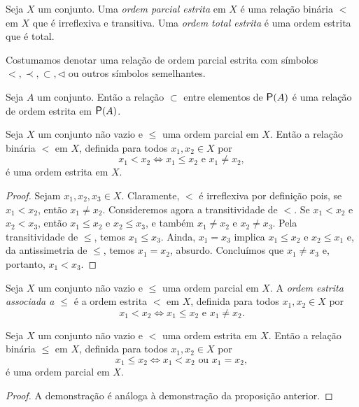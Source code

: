 \begin{definition}
	Seja $X$ um conjunto. Uma \emph{ordem parcial estrita} em $X$ é uma relação binária $<$ em $X$ que é irreflexiva e transitiva. Uma \emph{ordem total estrita} é uma ordem estrita que é total.
\end{definition}

	Costumamos denotar uma relação de ordem parcial estrita com símbolos $<, \prec, \subset, \lhd$ ou outros símbolos semelhantes.

\begin{example}
	Seja $A$ um conjunto. Então a relação $\subset$ entre elementos de $\p(A)$ é uma relação de ordem estrita em $\p(A)$.
\end{example}

\begin{proposition}
	Seja $X$ um conjunto não vazio e $\leq$ uma ordem parcial em $X$. Então a relação binária $<$ em $X$, definida para todos $x_1,x_2 \in X$ por
	\begin{equation*}
	x_1 < x_2 \Leftrightarrow x_1 \leq x_2 \text{\ \ e\ \ } x_1 \neq x_2,
	\end{equation*}
é uma ordem estrita em $X$.
\end{proposition}
\begin{proof}
	Sejam $x_1,x_2,x_3 \in X$. Claramente, $<$ é irreflexiva por definição pois, se $x_1 < x_2$, então $x_1 \neq x_2$. Consideremos agora a transitividade de $<$. Se $x_1 < x_2$ e $x_2 < x_3$, então $x_1 \leq x_2$ e $x_2 \leq x_3$, e também $x_1 \neq x_2$ e $x_2 \neq x_3$. Pela transitividade de $\leq$, temos $x_1 \leq x_3$. Ainda, $x_1=x_3$ implica $x_1 \leq x_2$ e $x_2 \leq x_1$ e, da antissimetria de $\leq$, temos $x_1 = x_2$, absurdo. Concluímos que $x_1 \neq x_3$ e, portanto, $x_1 < x_3$.
\end{proof}

\begin{definition}
	Seja $X$ um conjunto não vazio e $\leq$ uma ordem parcial em $X$. A \emph{ordem estrita associada a $\leq$} é a ordem estrita $<$ em $X$, definida para todos $x_1,x_2 \in X$ por
	\begin{equation*}
	x_1 < x_2 \Leftrightarrow x_1 \leq x_2 \text{\ \ e\ \ } x_1 \neq x_2.
	\end{equation*}
\end{definition}

\begin{proposition}
	Seja $X$ um conjunto não vazio e $<$ uma ordem estrita em $X$. Então a relação binária $\leq$ em $X$, definida para todos $x_1,x_2 \in X$ por
	\begin{equation*}
	x_1 \leq x_2 \Leftrightarrow x_1 < x_2 \text{\ \ ou\ \ } x_1 = x_2,
	\end{equation*}
é uma ordem parcial em $X$.
\end{proposition}
\begin{proof}
	A demonstração é análoga à demonstração da proposição anterior.
\end{proof}

